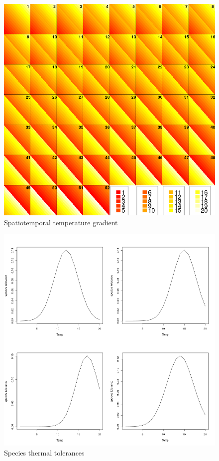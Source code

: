\documentclass[review]{elsarticle}
\begin{document}
\begin{figure}[!ht]
	\includegraphics[width = \linewidth]{Plots/Temperature_gradient}
	\caption{Spatiotemporal temperature gradient}
	\label{fig:3}
\end{figure}

\begin{figure}[!ht]
	\includegraphics[width = \linewidth]{Plots/Species_tolerances}
	\caption{Species thermal tolerances}
	\label{fig:4}
\end{figure}
\end{document}
